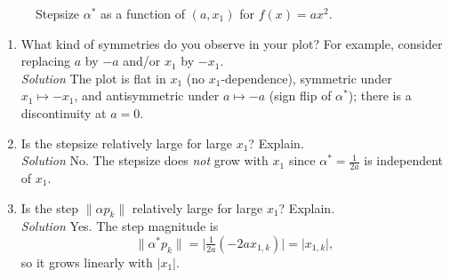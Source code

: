 \documentclass[11pt]{article}
\begin{document}
\begin{enumerate}[label=\textbf{1(\alph*)}]
		\begin{figure}[H]
			\centering
			\caption{Stepsize $\alpha^*$ as a function of $(a, x_1)$ for $f(x)=a x^2$.}
			\label{fig:1cii}
		\end{figure}
		
		\begin{enumerate}[label=\roman*.]
			\item What kind of symmetries do you observe in your plot? For example, consider replacing $a$ by $-a$ and/or $x_1$ by $-x_1$.\\
			\textit{Solution} The plot is flat in $x_1$ (no $x_1$-dependence), symmetric under $x_1\mapsto -x_1$, and antisymmetric under $a\mapsto -a$ (sign flip of $\alpha^\ast$); there is a discontinuity at $a=0$.\\
			
			\item Is the stepsize relatively large for large $x_1$? Explain.\\
			\textit{Solution} No. The stepsize does \emph{not} grow with $x_1$ since $\alpha^\ast=\frac{1}{2a}$ is independent of $x_1$.\\
			
			\item Is the step $\| \alpha p_k \|$ relatively large for large $x_1$? Explain.\\
			\textit{Solution} Yes. The step magnitude is
			\[
			\|\alpha^\ast p_k\|=\Big\lvert \tfrac{1}{2a}(-2a x_{1,k})\Big\rvert=\lvert x_{1,k}\rvert,
			\]
			so it grows linearly with $\lvert x_1\rvert$.\\
			

\end{enumerate}
\end{enumerate}
\end{document}
